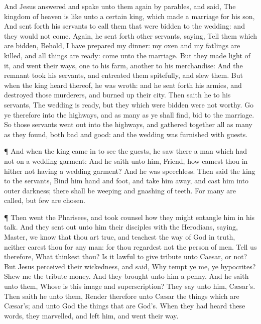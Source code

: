  And Jesus answered and spake unto them again by parables,
and said,  The kingdom of heaven is like unto a certain
king, which made a marriage for his son,  And sent forth his
servants to call them that were bidden to the wedding: and they would
not come.  Again, he sent forth other servants, saying, Tell
them which are bidden, Behold, I have prepared my dinner: my oxen and my
fatlings are killed, and all things are ready: come unto the marriage.
 But they made light of it, and went their ways, one to his
farm, another to his merchandise:  And the remnant took his
servants, and entreated them spitefully, and slew them.  But
when the king heard thereof, he was wroth: and he sent forth his armies,
and destroyed those murderers, and burned up their city. 
Then saith he to his servants, The wedding is ready, but they which were
bidden were not worthy.  Go ye therefore into the highways,
and as many as ye shall find, bid to the marriage.  So
those servants went out into the highways, and gathered together all as
many as they found, both bad and good: and the wedding was furnished
with guests.

 ¶ And when the king came in to see the guests, he saw
there a man which had not on a wedding garment:  And he
saith unto him, Friend, how camest thou in hither not having a wedding
garment? And he was speechless.  Then said the king to the
servants, Bind him hand and foot, and take him away, and cast him into
outer darkness; there shall be weeping and gnashing of teeth.
 For many are called, but few are chosen.

 ¶ Then went the Pharisees, and took counsel how they might
entangle him in his talk.  And they sent out unto him their
disciples with the Herodians, saying, Master, we know that thou art
true, and teachest the way of God in truth, neither carest thou for any
man: for thou regardest not the person of men.  Tell us
therefore, What thinkest thou? Is it lawful to give tribute unto Caesar,
or not?  But Jesus perceived their wickedness, and said,
Why tempt ye me, ye hypocrites?  Shew me the tribute money.
And they brought unto him a penny.  And he saith unto them,
Whose is this image and superscription?  They say unto him,
Cæsar's. Then saith he unto them, Render therefore unto Cæsar the things
which are Cæsar's; and unto God the things that are God's. 
When they had heard these words, they marvelled, and left him, and went
their way.

